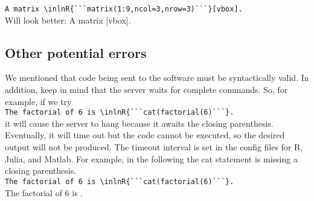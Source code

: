 \documentclass[a4paper,10pt]{article}
\begin{document}
\verb|A matrix \inlnR{```matrix(1:9,ncol=3,nrow=3)```}[vbox].|\\
Will look better: A matrix [vbox].

\subsection*{Other potential errors}
We mentioned that code being sent to the software must be syntactically valid. In addition, keep in mind that the server waits for complete commands. So, for example, if we try\\
\verb|The factorial of 6 is \inlnR{```cat(factorial(6)```}.|\\
it will cause the server to hang because it awaits the closing parenthesis. Eventually, it will time out but the code cannot be executed, so the desired output will not be produced. The timeout interval is set in the config files for R, Julia, and Matlab.
For example, in the following the cat statement is missing a closing parenthesis.\\
\verb|The factorial of 6 is \inlnR{```cat(factorial(6)```}.|\\
The factorial of 6 is .



\end{document}
